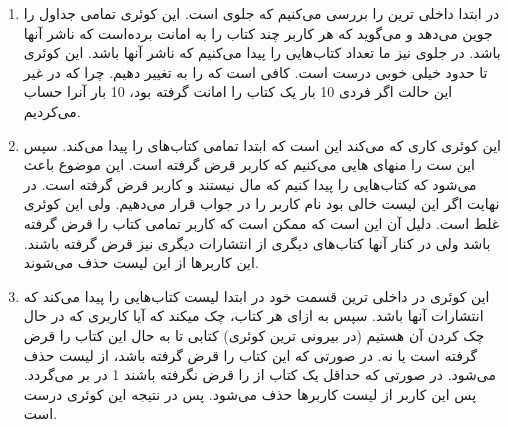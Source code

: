 \begin{enumerate}
    \item در ابتدا داخلی ترین 
    را بررسی می‌کنیم که جلوی
    است. این کوئری تمامی جداول را جوین می‌دهد و می‌گوید که هر کاربر چند کتاب را به امانت برده‌است که ناشر آنها
    باشد. در جلوی
    نیز ما تعداد کتاب‌هایی را پیدا می‌کنیم که ناشر آنها
    باشد. این کوئری تا حدود خیلی خوبی درست است. کافی است که
    را به
    تغییر دهیم. چرا که در غیر این حالت اگر فردی 10 بار یک کتاب را امانت گرفته بود، 10 بار آنرا حساب
    می‌کردیم.
    \item این کوئری کاری که می‌کند این است که ابتدا
    تمامی کتاب‌های
    را پیدا می‌کند. سپس این ست را منهای
    هایی
    می‌کنیم که کاربر قرض گرفته است. این موضوع باعث می‌شود که
    کتاب‌هایی را پیدا کنیم که مال
    نیستند و کاربر قرض گرفته است. در نهایت اگر این لیست خالی بود نام کاربر را در جواب
    قرار می‌دهیم. ولی این کوئری غلط است. دلیل آن این است که ممکن است که کاربر تمامی کتاب را قرض گرفته باشد
    ولی در کنار آنها کتاب‌های دیگری از انتشارات دیگری نیز قرض گرفته باشند. این کاربر‌ها از این لیست
    حذف می‌شوند.
    \item این کوئری در داخلی ترین قسمت خود در ابتدا لیست کتاب‌هایی را پیدا می‌کند که انتشارات آنها
    باشد. سپس به ازای هر کتاب، چک میکند که آیا کاربری که در حال چک کردن آن هستیم
    (در بیرونی ترین کوئری)
    کتابی تا به حال این کتاب را قرض گرفته است یا نه. در صورتی که این کتاب را قرض گرفته باشد، از لیست
    حذف می‌شود. در صورتی که حداقل یک کتاب از
    را قرض نگرفته باشند 1 در
    بر می‌گردد. پس این کاربر از لیست کاربرها حذف می‌شود. پس در نتیجه این کوئری درست است.
\end{enumerate}
